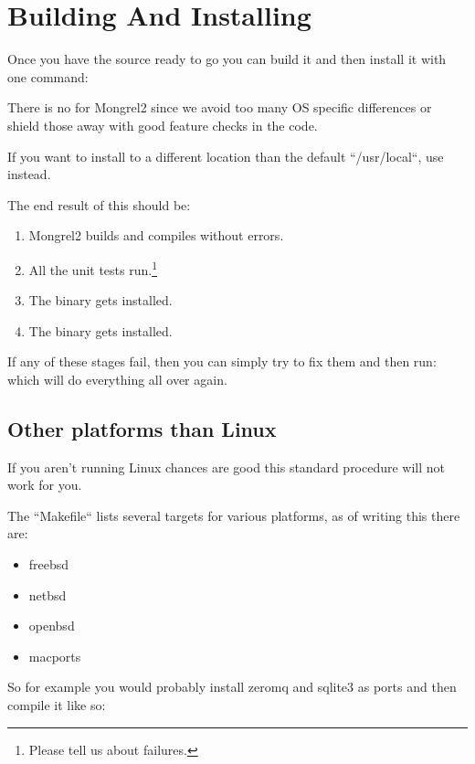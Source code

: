 \section{Building And Installing}

Once you have the source ready to go you can build it and then install it with
one command:  

There is no  for Mongrel2 since we avoid too many OS specific
differences or shield those away with good feature checks in the code.

If you want to install to a different location than the default  ``/usr/local``,
use  instead.

The end result of this should be:

\begin{enumerate}
\item Mongrel2 builds and compiles without errors.
\item All the unit tests run.\footnote{Please tell us about failures.}
\item The  binary gets installed.
\item The  binary gets installed.
\end{enumerate}

If any of these stages fail, then you can simply try to fix them and then
run:   which will do everything all over again.

\subsection{Other platforms than Linux}

If you aren't running Linux chances are good this standard procedure will not work for you.

The ``Makefile`` lists several targets for various platforms, as of writing this there are:

\begin{itemize}
\item freebsd
\item netbsd
\item openbsd
\item macports
\end{itemize}

So for example you would probably install zeromq and sqlite3 as ports and then compile it like so:

